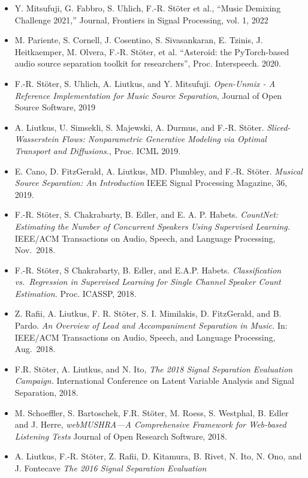 \documentclass[a4paper,11pt]{article}
\providecommand{\tightlist}{%
  \setlength{\itemsep}{0pt}\setlength{\parskip}{0pt}}
\begin{document}
\begin{itemize}
\tightlist
\item
  Y. Mitsufuji, G. Fabbro, S. Uhlich, F.-R. Stöter et al., “Music Demixing Challenge 2021,” Journal, Frontiers in Signal Processing, vol. 1, 2022
\item 
  M. Pariente, S. Cornell, J. Cosentino, S. Sivasankaran, E. Tzinis, J. Heitkaemper, M. Olvera, F.-R. Stöter, et al. “Asteroid: the PyTorch-based audio source separation toolkit for researchers”,  Proc. Interspeech. 2020.
\item
  F.-R. Stöter, S. Uhlich, A. Liutkus, and Y. Mitsufuji.
  \emph{Open-Unmix - A Reference Implementation for Music Source Separation}, Journal of Open Source Software, 2019
\item
  A. Liutkus, U. Simsekli, S. Majewski, A. Durmus, and F.-R. Stöter.
  \emph{Sliced-Wasserstein Flows: Nonparametric Generative Modeling via
  Optimal Transport and Diffusions.}, Proc. ICML 2019.
\item
  E. Cano, D. FitzGerald, A. Liutkus, MD. Plumbley, and F.-R. Stöter.
  \emph{Musical Source Separation: An Introduction} IEEE Signal
  Processing Magazine, 36, 2019.
\item
  F.-R. Stöter, S. Chakrabarty, B. Edler, and E. A. P. Habets.
  \emph{CountNet: Estimating the Number of Concurrent Speakers Using
  Supervised Learning.} IEEE/ACM Transactions on Audio, Speech, and
  Language Processing, Nov.~2018.
\item
  F.-R. Stöter, S Chakrabarty, B. Edler, and E.A.P. Habets.
  \emph{Classification vs.~Regression in Supervised Learning for Single
  Channel Speaker Count Estimation.} Proc. ICASSP, 2018.
\item
  Z. Rafii, A. Liutkus, F. R. Stöter, S. I. Mimilakis, D.
  FitzGerald, and B. Pardo. \emph{An Overview of Lead and Accompaniment
  Separation in Music.} In: IEEE/ACM Transactions on Audio, Speech, and
  Language Processing, Aug.~2018.
\item
  F.R. Stöter, A. Liutkus, and N. Ito, \emph{The 2018 Signal
  Separation Evaluation Campaign.} International Conference on Latent
  Variable Analysis and Signal Separation, 2018.
\item
  M. Schoeffler, S. Bartoschek, F.R. Stöter, M. Roess, S.
  Westphal, B. Edler and J. Herre, \emph{webMUSHRA---A Comprehensive
  Framework for Web-based Listening Tests} Journal of Open Research
  Software, 2018.
\item
  A. Liutkus, F.-R. Stöter, Z. Rafii, D. Kitamura, B. Rivet, N.
  Ito, N. Ono, and J. Fontecave \emph{The 2016 Signal Separation Evaluation
}
\end{itemize}
\end{document}
